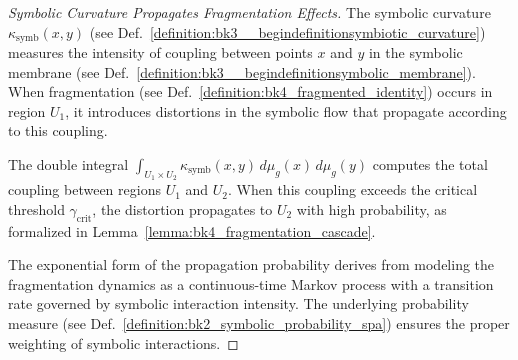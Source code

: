 \begin{proof}[Symbolic Curvature Propagates Fragmentation Effects]
\label{proof:bk4_symbolic_curvature_fragmentation}
The symbolic curvature $\kappa_{\text{symb}}(x,y)$ (see Def.~\ref{definition:bk3__begindefinitionsymbiotic_curvature}) measures the intensity of coupling between points $x$ and $y$ in the symbolic membrane (see Def.~\ref{definition:bk3__begindefinitionsymbolic_membrane}). When fragmentation (see Def.~\ref{definition:bk4_fragmented_identity}) occurs in region $U_1$, it introduces distortions in the symbolic flow that propagate according to this coupling.

The double integral $\int_{U_1 \times U_2} \kappa_{\text{symb}}(x,y) \, d\mu_g(x) \, d\mu_g(y)$ computes the total coupling between regions $U_1$ and $U_2$. When this coupling exceeds the critical threshold $\gamma_{\text{crit}}$, the distortion propagates to $U_2$ with high probability, as formalized in Lemma~\ref{lemma:bk4_fragmentation_cascade}.

The exponential form of the propagation probability derives from modeling the fragmentation dynamics as a continuous-time Markov process with a transition rate governed by symbolic interaction intensity. The underlying probability measure (see Def.~\ref{definition:bk2_symbolic_probability_spa}) ensures the proper weighting of symbolic interactions.
\end{proof}
